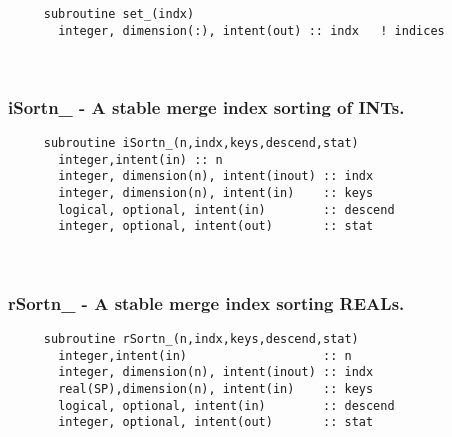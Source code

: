 \begin{verbatim} 
     subroutine set_(indx)
       integer, dimension(:), intent(out) :: indx	! indices
 \end{verbatim} %
 
 
\mbox{}\hrulefill\ 
 

  \subsubsection{iSortn\_ - A stable merge index sorting of INTs.}

\begin{verbatim} 
     subroutine iSortn_(n,indx,keys,descend,stat)
       integer,intent(in) :: n
       integer, dimension(n), intent(inout) :: indx
       integer, dimension(n), intent(in)    :: keys
       logical, optional, intent(in)        :: descend
       integer, optional, intent(out)       :: stat
 \end{verbatim} %
 
 
\mbox{}\hrulefill\ 
 

  \subsubsection{rSortn\_ - A stable merge index sorting REALs.}

\begin{verbatim} 
     subroutine rSortn_(n,indx,keys,descend,stat)
       integer,intent(in)                   :: n
       integer, dimension(n), intent(inout) :: indx
       real(SP),dimension(n), intent(in)    :: keys
       logical, optional, intent(in)        :: descend
       integer, optional, intent(out)       :: stat
 \end{verbatim}%
 
